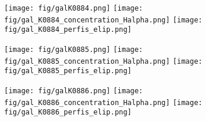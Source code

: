 \begin{figure}[!ht]
\begin{center}
\setcaptionmargin{1cm}
\texttt{[image: fig/galK0884.png]}
\texttt{[image: fig/gal\_K0884\_concentration\_Halpha.png]}
\texttt{[image: fig/gal\_K0884\_perfis\_elip.png]}
\end{center}
\end{figure}


\begin{figure}[!ht]
\begin{center}
\setcaptionmargin{1cm}
\texttt{[image: fig/galK0885.png]}
\texttt{[image: fig/gal\_K0885\_concentration\_Halpha.png]}
\texttt{[image: fig/gal\_K0885\_perfis\_elip.png]}
\end{center}
\end{figure}


\begin{figure}[!ht]
\begin{center}
\setcaptionmargin{1cm}
\texttt{[image: fig/galK0886.png]}
\texttt{[image: fig/gal\_K0886\_concentration\_Halpha.png]}
\texttt{[image: fig/gal\_K0886\_perfis\_elip.png]}
\end{center}
\end{figure}

